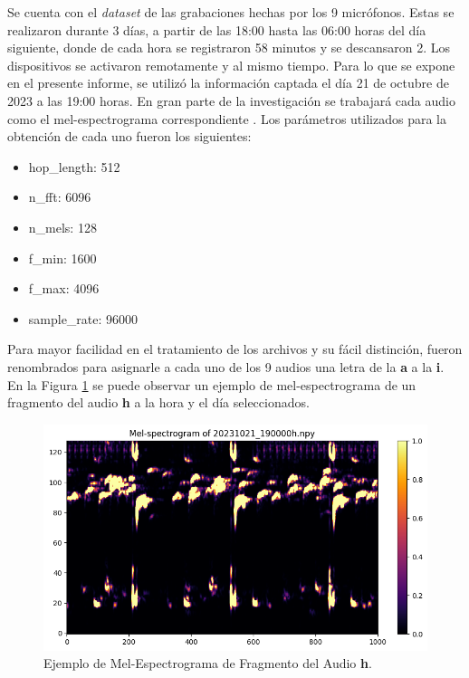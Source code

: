 \documentclass[a4paper,10pt,twocolumn]{article}
\begin{document}
Se cuenta con el \textit{dataset} de las grabaciones hechas por los 9 micrófonos. 
Estas se realizaron durante 3 días, a partir de las 18:00 hasta las 06:00 horas del día siguiente,
donde de cada hora se registraron 58 minutos y se descansaron 2. 
Los dispositivos se activaron remotamente y al mismo tiempo. 
Para lo que se expone en el presente informe, se utilizó la información
captada el día 21 de octubre de 2023 a las 19:00 horas.
En gran parte de la investigación se trabajará cada audio como el mel-espectrograma 
correspondiente \cite{mel}. Los parámetros utilizados para la obtención de cada uno fueron los siguientes:

\begin{itemize}
	\item hop\_length: 512
	\item n\_fft: 6096
	\item n\_mels: 128
	\item f\_min: 1600
	\item f\_max: 4096
	\item sample\_rate: 96000
\end{itemize}

Para mayor facilidad en el tratamiento de los archivos y su fácil distinción, fueron 
renombrados para asignarle a cada uno de los 9 audios una letra de la \textbf{a} a la \textbf{i}.
En la Figura \ref{fig:mel} se puede observar un ejemplo de mel-espectrograma de un fragmento del audio \textbf{h}
a la hora y el día seleccionados.

\begin{figure}[h!]
    \centering
    \includegraphics[width=\columnwidth]{assets/mel-spectrogram.png}
    \caption{Ejemplo de Mel-Espectrograma de Fragmento del Audio \textbf{h}.}
    \label{fig:mel}
\end{figure}
\end{document}
